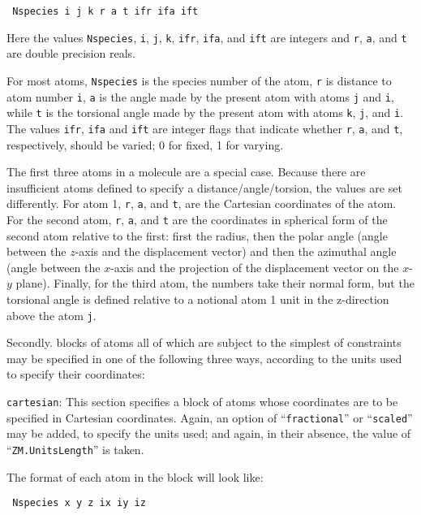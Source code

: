 \begin{description}
\noindent\texttt{    Nspecies i j k r a t ifr ifa ift}

Here the values \texttt{Nspecies}, \texttt{i}, \texttt{j}, \texttt{k},
\texttt{ifr}, \texttt{ifa}, and \texttt{ift} are integers and
\texttt{r}, \texttt{a}, and \texttt{t} are double precision reals.

For most atoms, \texttt{Nspecies} is the species number of the atom,
\texttt{r} is distance to atom number \texttt{i}, \texttt{a} is the
angle made by the present atom with atoms \texttt{j} and \texttt{i},
while \texttt{t} is the torsional angle made by the present atom with
atoms \texttt{k}, \texttt{j}, and \texttt{i}. The values \texttt{ifr},
\texttt{ifa} and \texttt{ift} are integer flags that indicate whether
\texttt{r}, \texttt{a}, and \texttt{t}, respectively, should be
varied; 0 for fixed, 1 for varying.


The first three atoms in a molecule are a special case. Because there
are insufficient atoms defined to specify a distance/angle/torsion,
the values are set differently. For atom 1, \texttt{r}, \texttt{a},
and \texttt{t}, are the Cartesian coordinates of the atom.  For the
second atom, \texttt{r}, \texttt{a}, and \texttt{t} are the
coordinates in spherical form of the second atom relative to the
first: first the radius, then the polar angle (angle between the
$z$-axis and the displacement vector) and then the azimuthal angle
(angle between the $x$-axis and the projection of the displacement
vector on the $x$-$y$ plane). Finally, for the third atom, the numbers
take their normal form, but the torsional angle is defined relative to
a notional atom 1 unit in the z-direction above the atom \texttt{j}.

Secondly. blocks of atoms all of which are subject to the simplest of
constraints may be specified in one of the following three ways,
according to the units used to specify their coordinates:


\item \texttt{cartesian}: This section specifies a block of atoms
whose coordinates are to be specified in Cartesian coordinates. Again,
an option of ``\texttt{fractional}'' or ``\texttt{scaled}'' may be
added, to specify the units used; and again, in their absence, the
value of ``\texttt{ZM.UnitsLength}'' is taken.

The format of each atom in the block will look like:

\noindent\texttt{      Nspecies x y z ix iy iz}


\end{description}
